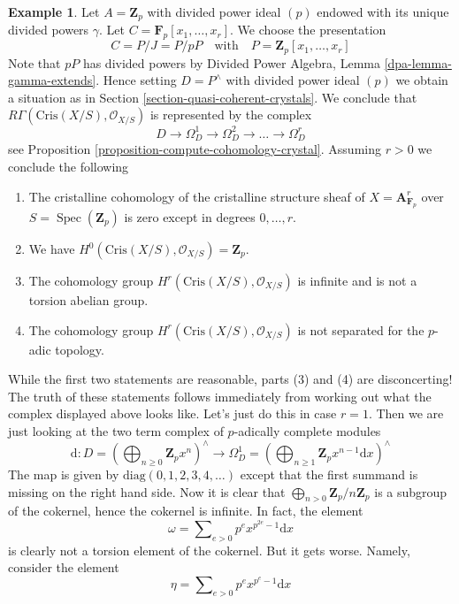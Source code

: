 \documentclass{stacks-project}
\theoremstyle{plain}
\theoremstyle{definition}
\newtheorem{example}[subsection]{Example}
\theoremstyle{remark}
\numberwithin{equation}{subsection}
\def\Spec{\mathop{\mathrm{Spec}}}
\begin{document}
\begin{example}
\label{example-affine-n-space}
Let $A = \mathbf{Z}_p$ with divided power ideal $(p)$ endowed with
its unique divided powers $\gamma$. Let
$C = \mathbf{F}_p[x_1, \ldots, x_r]$. We choose the presentation
$$
C = P/J = P/pP\quad\text{with}\quad P = \mathbf{Z}_p[x_1, \ldots, x_r]
$$
Note that $pP$ has divided powers by
Divided Power Algebra, Lemma \ref{dpa-lemma-gamma-extends}.
Hence setting $D = P^\wedge$ with divided power ideal $(p)$ we obtain a
situation as in Section \ref{section-quasi-coherent-crystals}.
We conclude that $R\Gamma(\text{Cris}(X/S), \mathcal{O}_{X/S})$
is represented by the complex
$$
D \to \Omega^1_D \to \Omega^2_D \to \ldots \to \Omega^r_D
$$
see Proposition \ref{proposition-compute-cohomology-crystal}.
Assuming $r > 0$ we conclude the following
\begin{enumerate}
\item The cristalline cohomology of the cristalline structure sheaf
of $X = \mathbf{A}^r_{\mathbf{F}_p}$ over $S = \Spec(\mathbf{Z}_p)$
is zero except in degrees $0, \ldots, r$.
\item We have $H^0(\text{Cris}(X/S), \mathcal{O}_{X/S}) = \mathbf{Z}_p$.
\item The cohomology group $H^r(\text{Cris}(X/S), \mathcal{O}_{X/S})$
is infinite and is not a torsion abelian group.
\item The cohomology group $H^r(\text{Cris}(X/S), \mathcal{O}_{X/S})$
is not separated for the $p$-adic topology.
\end{enumerate}
While the first two statements are reasonable, parts (3) and (4) are
disconcerting! The truth of these statements follows immediately from
working out what the complex displayed above looks like. Let's just do
this in case $r = 1$. Then we are just looking at the two term complex
of $p$-adically complete modules
$$
\text{d} :
D = \left(
\bigoplus\nolimits_{n \geq 0} \mathbf{Z}_p x^n
\right)^\wedge
\longrightarrow
\Omega^1_D = \left(
\bigoplus\nolimits_{n \geq 1} \mathbf{Z}_p x^{n - 1}\text{d}x
\right)^\wedge
$$
The map is given by $\text{diag}(0, 1, 2, 3, 4, \ldots)$ except that
the first summand is missing on the right hand side. Now it is clear
that $\bigoplus_{n > 0} \mathbf{Z}_p/n\mathbf{Z}_p$ is a subgroup
of the cokernel, hence the cokernel is infinite. In fact, the element
$$
\omega = \sum\nolimits_{e > 0} p^e x^{p^{2e} - 1}\text{d}x
$$
is clearly not a torsion element of the cokernel. But it gets worse.
Namely, consider the element
$$
\eta = \sum\nolimits_{e > 0} p^e x^{p^e - 1}\text{d}x
$$

\end{example}
\end{document}
